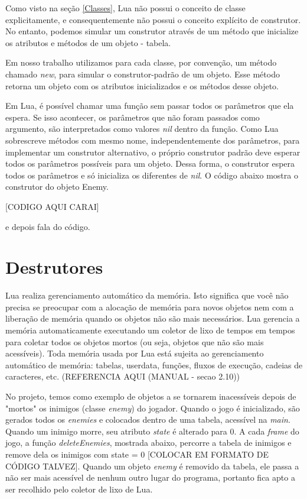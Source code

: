 \documentclass[rel_mlp]{iiufrgs}
\begin{document}
Como visto na seção \ref{Classes}, Lua não possui o conceito de classe explicitamente, e consequentemente não possui o conceito explícito de construtor. No entanto, podemos simular um construtor através de um método que inicialize os atributos e métodos de um objeto - tabela. 

Em nosso trabalho utilizamos para cada classe, por convenção, um método chamado \textit{new}, para simular o construtor-padrão de um objeto. Esse método retorna um objeto com os atributos inicializados e os métodos desse objeto.

Em Lua, é possível chamar uma função sem passar todos os parâmetros que ela espera. Se isso acontecer, os parâmetros que não foram passados como argumento, são interpretados como valores \textit{nil} dentro da função. Como Lua sobrescreve métodos com mesmo nome, independentemente dos parâmetros, para implementar um construtor alternativo, o próprio construtor padrão deve esperar todos os parâmetros possíveis para um objeto. Dessa forma, o construtor espera todos os parâmetros e só inicializa os diferentes de \textit{nil}. O código abaixo mostra o construtor do objeto Enemy.

[CODIGO AQUI CARAI]

e depois fala do código.


\section{Destrutores}

Lua realiza gerenciamento automático da memória. Isto significa que você não precisa se preocupar com a alocação de memória para novos objetos nem com a liberação de memória quando os objetos não são mais necessários. Lua gerencia a memória automaticamente executando um coletor de lixo de tempos em tempos para coletar todos os objetos mortos (ou seja, objetos que não são mais acessíveis). Toda memória usada por Lua está sujeita ao gerenciamento automático de memória: tabelas, userdata, funções, fluxos de execução, cadeias de caracteres, etc. (REFERENCIA AQUI (MANUAL - secao 2.10))

No projeto, temos como exemplo de objetos a se tornarem inacessíveis depois de "mortos" os inimigos (classe \textit{enemy}) do jogador. Quando o jogo é inicializado, são gerados todos os \textit{enemies} e colocados dentro de uma tabela, acessível na \textit{main}. Quando um inimigo morre, seu atributo \textit{state} é alterado para 0. A cada \textit{frame} do jogo, a função \textit{deleteEnemies}, mostrada abaixo, percorre a tabela de inimigos e remove dela os inimigos com state = 0 [COLOCAR EM FORMATO DE CÓDIGO TALVEZ]. Quando um objeto \textit{enemy} é removido da tabela, ele passa a não ser mais acessível de nenhum outro lugar do programa, portanto fica apto a ser recolhido pelo coletor de lixo de Lua.
\end{document}
